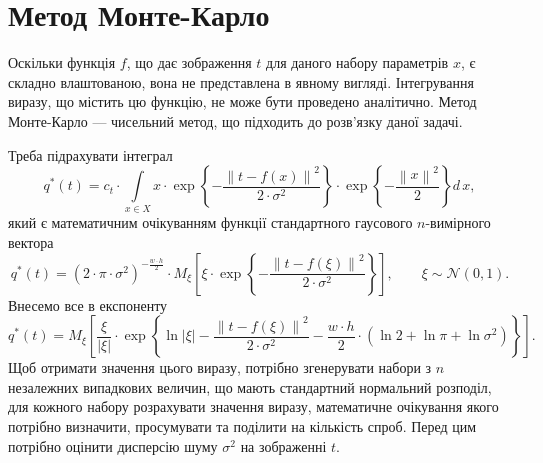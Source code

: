 \section{Метод Монте-Карло}

Оскільки функція $f$, що дає зображення $t$ для даного набору параметрів $x$,
є складно влаштованою, вона не представлена в явному вигляді.
Інтегрування виразу, що містить цю функцію, не може бути проведено аналітично.
Метод Монте-Карло --- чисельний метод, що підходить до розв'язку даної задачі.

Треба підрахувати інтеграл
\begin{equation*}
  q^* \left( t \right)
  = c_t
    \cdot \int\limits_{x \in X}
      x
      \cdot \exp{\left\{ - \frac{\left\| t - f\left( x \right) \right\|^2}
                                {2 \cdot \sigma^2} \right\}}
      \cdot \exp{\left\{ - \frac{\left\| x \right\|^2}{2} \right\}}
    d\,x,
\end{equation*}
який є математичним очікуванням функції
стандартного гаусового $n$-вимірного вектора
\begin{equation*}
  q^* \left( t \right)
  = \left( 2 \cdot \pi \cdot \sigma^2 \right)^{-\frac{w \cdot h}{2}}
    \cdot M_{\xi}\left[
      \xi
      \cdot \exp{\left\{ - \frac{\left\| t - f\left( \xi \right) \right\|^2}
        {2 \cdot \sigma^2} \right\}} \right], \qquad
    \xi \sim \mathcal{N}\left( 0, 1 \right).
\end{equation*}
Внесемо все в експоненту
\begin{equation*}
  q^* \left( t \right)
  = M_{\xi}\left[
    \frac{\xi}{\left| \xi \right|}
    \cdot \exp{\left\{
        \ln{\left| \xi \right|}
        - \frac{\left\| t - f\left( \xi \right) \right\|^2}{2 \cdot \sigma^2}
        - \frac{w \cdot h}{2}
          \cdot \left( \ln{2} + \ln{\pi} + \ln{\sigma^2} \right)
       \right\}
    } \right].
\end{equation*}
Щоб отримати значення цього виразу,
потрібно згенерувати набори з $n$ незалежних випадкових величин,
що мають стандартний нормальний розподіл,
для кожного набору розрахувати значення виразу,
математичне очікування якого потрібно визначити,
просумувати та поділити на кількість спроб.
Перед цим потрібно оцінити дисперсію шуму $\sigma^2$ на зображенні $t$.

